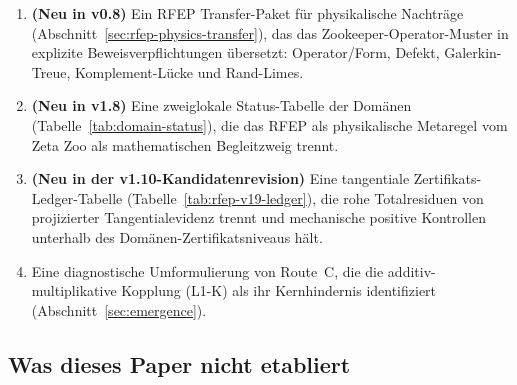 \documentclass[11pt,a4paper]{article}
\theoremstyle{plain}
\theoremstyle{definition}
\begin{document}
\begin{enumerate}[leftmargin=*]
  als Korollar einer Standard-Quasimode-zu-Projektor-Ungleichung.
\item \textbf{(Neu in v0.8)} Ein RFEP Transfer-Paket für physikalische
  Nachträge (Abschnitt~\ref{sec:rfep-physics-transfer}), das das
  Zookeeper-Operator-Muster in explizite Beweisverpflichtungen übersetzt:
  Operator/Form, Defekt, Galerkin-Treue, Komplement-Lücke und Rand-Limes.
\item \textbf{(Neu in v1.8)} Eine zweiglokale Status-Tabelle der Domänen
  (Tabelle~\ref{tab:domain-status}), die das RFEP als physikalische Metaregel
  vom Zeta Zoo als mathematischen Begleitzweig trennt.
\item \textbf{(Neu in der v1.10-Kandidatenrevision)} Eine tangentiale
  Zertifikats-Ledger-Tabelle (Tabelle~\ref{tab:rfep-v19-ledger}), die
  rohe Totalresiduen von projizierter Tangentialevidenz trennt und
  mechanische positive Kontrollen unterhalb des Domänen-Zertifikatsniveaus hält.
\item Eine diagnostische Umformulierung von Route~C, die die
  additiv-multiplikative Kopplung (L1-K) als ihr Kernhindernis identifiziert
  (Abschnitt~\ref{sec:emergence}).
\end{enumerate}

\subsection{Was dieses Paper nicht etabliert}
\end{document}
